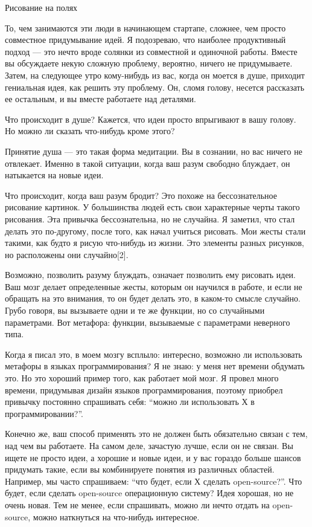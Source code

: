 \documentclass[ebook,12pt,oneside,openany]{memoir}
\begin{document}
Рисование на полях

То, чем занимаются эти люди в начинающем стартапе, сложнее, чем просто
совместное придумывание идей. Я подозреваю, что наиболее продуктивный
подход — это нечто вроде солянки из совместной и одиночной работы.
Вместе вы обсуждаете некую сложную проблему, вероятно, ничего не
придумываете. Затем, на следующее утро кому-нибудь из вас, когда он
моется в душе, приходит гениальная идея, как решить эту проблему. Он,
сломя голову, несется рассказать ее остальным, и вы вместе работаете
над деталями.

Что происходит в душе? Кажется, что идеи просто впрыгивают в вашу
голову. Но можно ли сказать что-нибудь кроме этого?

Принятие душа — это такая форма медитации. Вы в сознании, но вас
ничего не отвлекает. Именно в такой ситуации, когда ваш разум свободно
блуждает, он натыкается на новые идеи.

Что происходит, когда ваш разум бродит? Это похоже на бессознательное
рисование картинок. У большинства людей есть свои характерные черты
такого рисования. Эта привычка бессознательна, но не случайна. Я
заметил, что стал делать это по-другому, после того, как начал учиться
рисовать. Мои жесты стали такими, как будто я рисую что-нибудь из
жизни. Это элементы разных рисунков, но расположены они случайно[2].

Возможно, позволить разуму блуждать, означает позволить ему рисовать
идеи. Ваш мозг делает определенные жесты, которым он научился в
работе, и если не обращать на это внимания, то он будет делать это, в
каком-то смысле случайно. Грубо говоря, вы вызываете одни и те же
функции, но со случайными параметрами. Вот метафора: функции,
вызываемые с параметрами неверного типа.

Когда я писал это, в моем мозгу всплыло: интересно, возможно ли
использовать метафоры в языках программирования? Я не знаю: у меня нет
времени обдумать это. Но это хороший пример того, как работает мой
мозг. Я провел много времени, придумывая дизайн языков
программирования, поэтому приобрел привычку постоянно спрашивать себя:
“можно ли использовать Х в программировании?”.

Конечно же, ваш способ применять это не должен быть обязательно связан
с тем, над чем вы работаете. На самом деле, зачастую лучше, если он не
связан. Вы ищете не просто идеи, а хорошие и новые идеи, и у вас
гораздо больше шансов придумать такие, если вы комбинируете понятия из
различных областей. Например, мы часто спрашиваем: “что будет, если Х
сделать open-source?”. Что будет, если сделать open-source
операционную систему? Идея хорошая, но не очень новая. Тем не менее,
если спрашивать, можно ли нечто отдать на open-source, можно
наткнуться на что-нибудь интересное.
\end{document}
